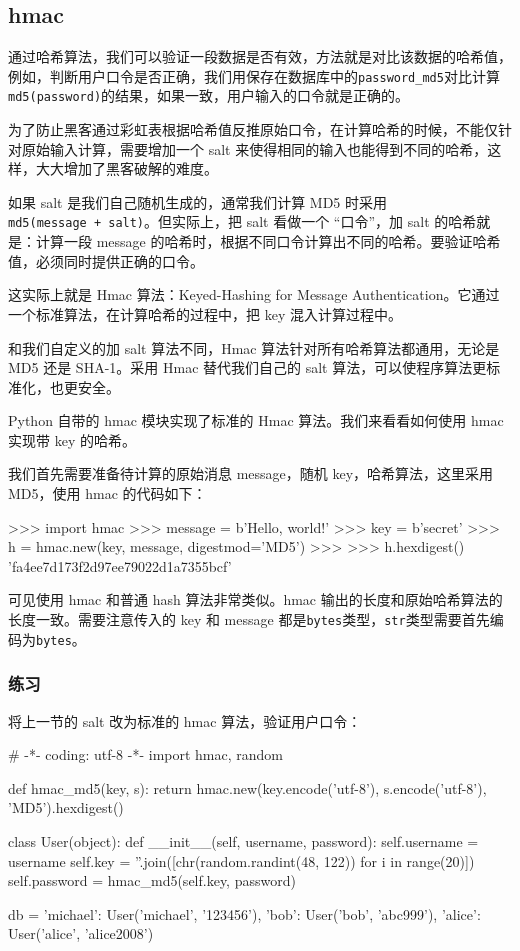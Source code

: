 \hypertarget{hmac}{%
\subsection{hmac}\label{hmac}}

通过哈希算法，我们可以验证一段数据是否有效，方法就是对比该数据的哈希值，例如，判断用户口令是否正确，我们用保存在数据库中的\texttt{password\_md5}对比计算\texttt{md5(password)}的结果，如果一致，用户输入的口令就是正确的。

为了防止黑客通过彩虹表根据哈希值反推原始口令，在计算哈希的时候，不能仅针对原始输入计算，需要增加一个
salt
来使得相同的输入也能得到不同的哈希，这样，大大增加了黑客破解的难度。

如果 salt 是我们自己随机生成的，通常我们计算 MD5
时采用\texttt{md5(message\ +\ salt)}。但实际上，把 salt 看做一个
``口令''，加 salt 的哈希就是：计算一段 message
的哈希时，根据不同口令计算出不同的哈希。要验证哈希值，必须同时提供正确的口令。

这实际上就是 Hmac 算法：Keyed-Hashing for Message
Authentication。它通过一个标准算法，在计算哈希的过程中，把 key
混入计算过程中。

和我们自定义的加 salt 算法不同，Hmac 算法针对所有哈希算法都通用，无论是
MD5 还是 SHA-1。采用 Hmac 替代我们自己的 salt
算法，可以使程序算法更标准化，也更安全。

Python 自带的 hmac 模块实现了标准的 Hmac 算法。我们来看看如何使用 hmac
实现带 key 的哈希。

我们首先需要准备待计算的原始消息 message，随机 key，哈希算法，这里采用
MD5，使用 hmac 的代码如下：

\begin{pythoncode}
>>> import hmac
>>> message = b'Hello, world!'
>>> key = b'secret'
>>> h = hmac.new(key, message, digestmod='MD5')
>>> 
>>> h.hexdigest()
'fa4ee7d173f2d97ee79022d1a7355bcf'
\end{pythoncode}

可见使用 hmac 和普通 hash 算法非常类似。hmac
输出的长度和原始哈希算法的长度一致。需要注意传入的 key 和 message
都是\texttt{bytes}类型，\texttt{str}类型需要首先编码为\texttt{bytes}。

\hypertarget{ux7ec3ux4e60}{%
\subsubsection{练习}\label{ux7ec3ux4e60}}

将上一节的 salt 改为标准的 hmac 算法，验证用户口令：

\begin{pythoncode}
# -*- coding: utf-8 -*-
import hmac, random

def hmac_md5(key, s):
    return hmac.new(key.encode('utf-8'), s.encode('utf-8'), 'MD5').hexdigest()

class User(object):
    def __init__(self, username, password):
        self.username = username
        self.key = ''.join([chr(random.randint(48, 122)) for i in range(20)])
        self.password = hmac_md5(self.key, password)

db = {
    'michael': User('michael', '123456'),
    'bob': User('bob', 'abc999'),
    'alice': User('alice', 'alice2008')
}
\end{pythoncode}

